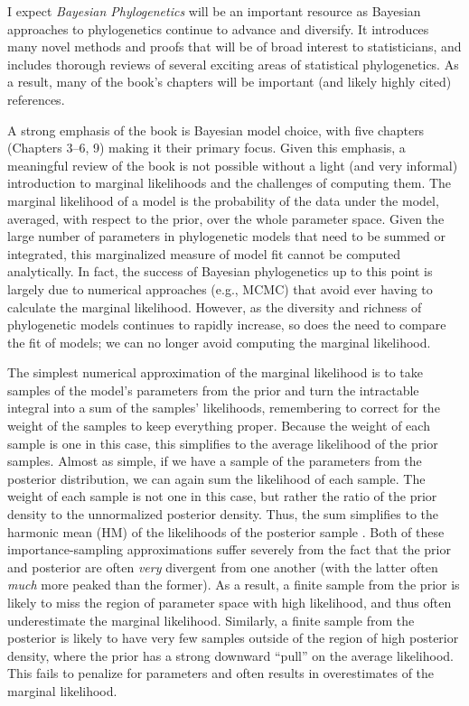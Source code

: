 \documentclass[letterpaper,12pt]{article}
\newcommand{\booktitle}{\textit{Bayesian Phylogenetics}\xspace}
\begin{document}
I expect \booktitle will be an important resource as Bayesian approaches to
phylogenetics continue to advance and diversify.
It introduces many novel methods and proofs that will be of broad interest to
statisticians, and includes thorough reviews of several exciting areas of
statistical phylogenetics.
As a result, many of the book's chapters will be important (and likely highly
cited) references.

A strong emphasis of the book is Bayesian model choice, with five chapters
(Chapters 3--6, 9) making it their primary focus.
Given this emphasis, a meaningful review of the book is not possible without a
light (and very informal) introduction to marginal likelihoods and the
challenges of computing them.
The marginal likelihood of a model is the probability of the data under the
model, averaged, with respect to the prior, over the whole parameter space.
Given the large number of parameters in phylogenetic models that need
to be summed or integrated, this marginalized measure of model fit cannot
be computed analytically.
In fact, the success of Bayesian phylogenetics up to this point is largely due
to numerical approaches (e.g., MCMC) that avoid ever having to calculate the
marginal likelihood.
However, as the diversity and richness of phylogenetic models continues to
rapidly increase, so does the need to compare the fit of models;
we can no longer avoid computing the marginal likelihood.

The simplest numerical approximation of the marginal likelihood is to take
samples of the model's parameters from the prior and turn the intractable
integral into a sum of the samples' likelihoods, remembering to correct for the
weight of the samples to keep everything proper. Because the weight of each
sample is one in this case, this simplifies to the average likelihood of the
prior samples.
Almost as simple, if we have a sample of the parameters from the posterior
distribution, we can again sum the likelihood of each sample.
The weight of each sample is not one in this case, but rather the ratio of the
prior density to the unnormalized posterior density.
Thus, the sum simplifies to the harmonic mean (HM) of the likelihoods of the
posterior sample \citep{Newton1994}.
Both of these importance-sampling approximations suffer severely from the fact
that the prior and posterior are often \emph{very} divergent from one another
(with the latter often \emph{much} more peaked than the former).
As a result, a finite sample from the prior is likely to miss the region of
parameter space with high likelihood, and thus often underestimate the marginal
likelihood.
Similarly, a finite sample from the posterior is likely to have very few
samples outside of the region of high posterior density, where the prior has a
strong downward ``pull'' on the average likelihood. This fails to penalize for
parameters and often results in overestimates of the marginal likelihood.
\end{document}
